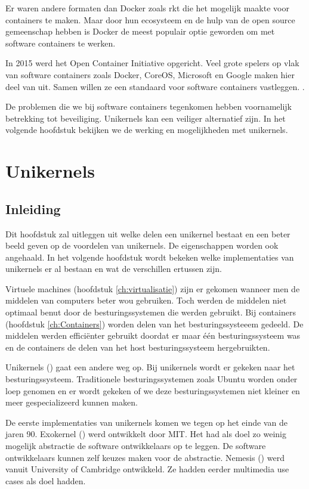 \documentclass[pdftex,a4paper,12pt,twoside]{report}
\begin{document}
Er waren andere formaten dan Docker zoals rkt \cite{_rkt_????} die het mogelijk maakte voor containers te maken. Maar door hun ecosysteem en de hulp van de open source gemeenschap hebben is Docker de meest populair optie \cite{oreilly_media_docker_2015} geworden om met software containers te werken.

In 2015 werd het Open Container Initiative opgericht. Veel grote spelers op vlak van software containers zoals Docker, CoreOS, Microsoft en Google maken hier deel van uit. Samen willen ze een standaard voor software containers vastleggen. \cite{}.

De problemen die we bij software containers tegenkomen hebben voornamelijk betrekking tot beveiliging. Unikernels kan een veiliger alternatief zijn. In het volgende hoofdstuk bekijken we de werking en mogelijkheden met unikernels.

\chapter{Unikernels}
\label{ch:unikernels}

\section{Inleiding}

Dit hoofdstuk zal uitleggen uit welke delen een unikernel bestaat en een beter beeld geven op de voordelen van unikernels. De eigenschappen worden ook angehaald. In het volgende hoofdstuk wordt bekeken welke implementaties van unikernels er al bestaan en wat de verschillen ertussen zijn.

Virtuele machines (hoofdstuk \ref{ch:virtualisatie}) zijn er gekomen wanneer men de middelen van computers beter wou gebruiken. Toch werden de middelen niet optimaal benut door de besturingssystemen die werden gebruikt. Bij containers (hoofdstuk \ref{ch:Containers}) worden delen van het besturingssysteeem gedeeld. De middelen werden efficiënter gebruikt doordat er maar één besturingssysteem was en de containers de delen van het host besturingssysteem hergebruikten.

Unikernels (\cite{madhavapeddy_unikernels_2013}) gaat een andere weg op. Bij unikernels wordt er gekeken naar het besturingssysteem. Traditionele besturingssystemen zoals Ubuntu worden onder loep genomen en er wordt gekeken of we deze besturingssystemen niet kleiner en meer gespecializeerd kunnen maken.

De eerste implementaties van unikernels komen we tegen op het einde van de jaren 90. Exokernel (\cite{mit_mit_1998}) werd ontwikkelt door MIT. Het had als doel zo weinig mogelijk abstractie de software ontwikkelaars op te leggen. De software ontwikkelaars kunnen zelf keuzes maken voor de abstractie. Nemesis (\cite{university_of_cambridge_nemesis_2000}) werd vanuit University of Cambridge ontwikkeld. Ze hadden eerder multimedia use cases als doel hadden.
\end{document}
